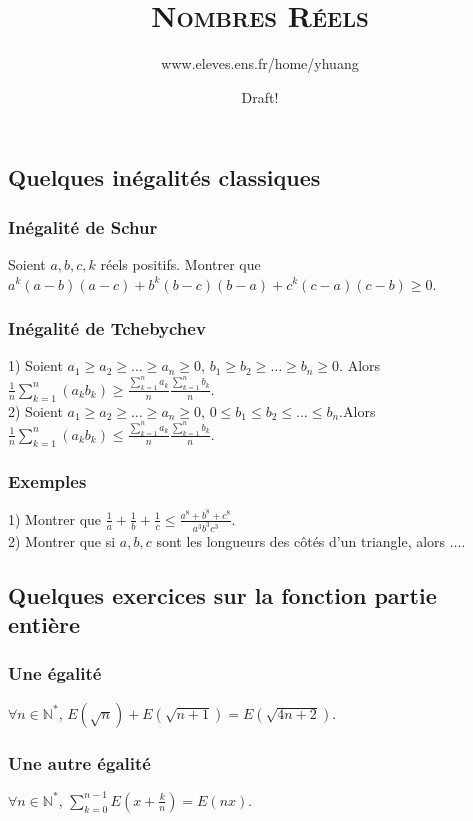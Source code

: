 \documentclass{article}
\begin{document}
\setcounter{section}{10}

\title{\textsc{Nombres R\'eels}}
\author{www.eleves.ens.fr/home/yhuang}
\date{\textsf{Draft!}}
\maketitle

\subsection{Quelques in\'egalit\'es classiques}
\subsubsection{In\'egalit\'e de Schur}
Soient $a,b,c,k$ r\'eels positifs. Montrer que $a^k(a-b)(a-c)+b^k(b-c)(b-a)+c^k(c-a)(c-b)\geq 0$.
\subsubsection{In\'egalit\'e de Tchebychev}
1) Soient $a_1\geq a_2\geq\dots\geq a_n\geq0$, $b_1\geq b_2\geq\dots\geq b_n\geq0$. Alors $\frac{1}{n}\sum\limits_{k=1}^{n}(a_kb_k)\geq\frac{\sum\limits_{k=1}^{n}a_k}{n}\frac{\sum\limits_{k=1}^{n}b_k}{n}$.\\
2) Soient $a_1\geq a_2\geq\dots\geq a_n\geq0$, $0\leq b_1\leq b_2\leq\dots\leq b_n$.Alors $\frac{1}{n}\sum\limits_{k=1}^{n}(a_kb_k)\leq\frac{\sum\limits_{k=1}^{n}a_k}{n}\frac{\sum\limits_{k=1}^{n}b_k}{n}$.
\subsubsection{Exemples}
1) Montrer que $\frac{1}{a}+\frac{1}{b}+\frac{1}{c}\leq\frac{a^8+b^8+c^8}{a^3b^3c^3}$.\\
2) Montrer que si $a,b,c$ sont les longueurs des c\^ot\'es d'un triangle, alors $\dots$.

\subsection{Quelques exercices sur la fonction partie enti\`ere}
\subsubsection{Une \'egalit\'e}
$\forall n\in\mathbb{N^*}$, $E(\sqrt{n})+E(\sqrt{n+1})=E(\sqrt{4n+2})$.
\subsubsection{Une autre \'egalit\'e}
$\forall n\in\mathbb{N^*}$, $\sum\limits_{k=0}^{n-1}E(x+\frac{k}{n})=E(nx)$.
\end{document}
